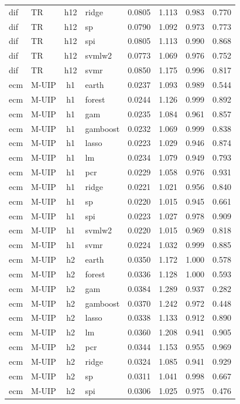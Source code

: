 \begin{ThreePartTable}
\begin{longtable}[t]{llclcccc}
dif & TR & h12 & ridge & 0.0805 & 1.113 & 0.983 & 0.770\\
dif & TR & h12 & sp & 0.0790 & 1.092 & 0.973 & 0.773\\
dif & TR & h12 & spi & 0.0805 & 1.113 & 0.990 & 0.868\\
dif & TR & h12 & svmlw2 & 0.0773 & 1.069 & 0.976 & 0.752\\
dif & TR & h12 & svmr & 0.0850 & 1.175 & 0.996 & 0.817\\
\addlinespace
ecm & M-UIP & h1 & earth & 0.0237 & 1.093 & 0.989 & 0.544\\
ecm & M-UIP & h1 & forest & 0.0244 & 1.126 & 0.999 & 0.892\\
ecm & M-UIP & h1 & gam & 0.0235 & 1.084 & 0.961 & 0.857\\
ecm & M-UIP & h1 & gamboost & 0.0232 & 1.069 & 0.999 & 0.838\\
ecm & M-UIP & h1 & lasso & 0.0223 & 1.029 & 0.946 & 0.874\\
ecm & M-UIP & h1 & lm & 0.0234 & 1.079 & 0.949 & 0.793\\
ecm & M-UIP & h1 & pcr & 0.0229 & 1.058 & 0.976 & 0.931\\
ecm & M-UIP & h1 & ridge & 0.0221 & 1.021 & 0.956 & 0.840\\
ecm & M-UIP & h1 & sp & 0.0220 & 1.015 & 0.945 & 0.661\\
ecm & M-UIP & h1 & spi & 0.0223 & 1.027 & 0.978 & 0.909\\
ecm & M-UIP & h1 & svmlw2 & 0.0220 & 1.015 & 0.969 & 0.818\\
ecm & M-UIP & h1 & svmr & 0.0224 & 1.032 & 0.999 & 0.885\\
\addlinespace
ecm & M-UIP & h2 & earth & 0.0350 & 1.172 & 1.000 & 0.578\\
ecm & M-UIP & h2 & forest & 0.0336 & 1.128 & 1.000 & 0.593\\
ecm & M-UIP & h2 & gam & 0.0384 & 1.289 & 0.937 & 0.282\\
ecm & M-UIP & h2 & gamboost & 0.0370 & 1.242 & 0.972 & 0.448\\
ecm & M-UIP & h2 & lasso & 0.0338 & 1.133 & 0.912 & 0.890\\
ecm & M-UIP & h2 & lm & 0.0360 & 1.208 & 0.941 & 0.905\\
ecm & M-UIP & h2 & pcr & 0.0344 & 1.153 & 0.955 & 0.969\\
ecm & M-UIP & h2 & ridge & 0.0324 & 1.085 & 0.941 & 0.929\\
ecm & M-UIP & h2 & sp & 0.0311 & 1.041 & 0.998 & 0.667\\
ecm & M-UIP & h2 & spi & 0.0306 & 1.025 & 0.975 & 0.476\\

\end{longtable}
\end{ThreePartTable}

